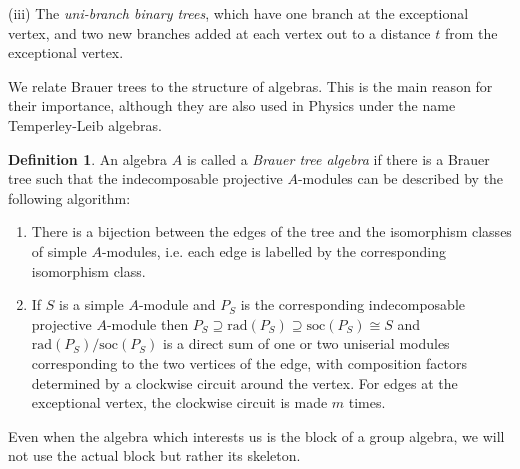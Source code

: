 \documentclass[11pt,english]{article}
\numberwithin{figure}{section}
\numberwithin{equation}{section}
\numberwithin{table}{section}
\theoremstyle{definition}
\newtheorem{defn}{Definition}[section]
\theoremstyle{remark}
\begin{document}
(iii) The \textit{uni-branch binary trees}, which have one branch at the exceptional vertex, and two new branches added at each vertex out to a distance $t$ from the exceptional vertex.


\noindent \smallskip{}


\noindent We relate Brauer trees to the structure of algebras. This is the main reason for their importance, although they are also used in Physics under the name Temperley-Leib algebras.

\noindent \begin{defn}An algebra $A$ is called a \textit{Brauer
		tree algebra} if there is a Brauer tree such that the indecomposable
	projective $A$-modules can be described by the following algorithm:\renewcommand{\labelenumi}{(\roman{enumi})}
	\begin{enumerate}
		\item There is a bijection between the edges of the tree and the isomorphism
		classes of simple $A$-modules, i.e. each edge is labelled by the
		corresponding isomorphism class. 
		\item If $S$ is a simple $A$-module and $P_{S}$ is the corresponding
		indecomposable projective $A$-module then $P_{S}\supseteq\text{rad}(P_{S})\supseteq\text{soc}(P_{S})\cong S$
		and $\text{rad}(P_{S})/\text{soc}(P_{S})$ is a direct sum of one
		or two uniserial modules corresponding to the two vertices of the edge, with composition factors determined 
		by a clockwise circuit around the vertex.  For edges at the exceptional vertex, 
		the clockwise circuit is made $m$ times.
	\end{enumerate}
	\noindent \end{defn}

\noindent  Even when the algebra which interests us is the block
of a group algebra, we will not use the actual block but rather its skeleton.
\end{document}
